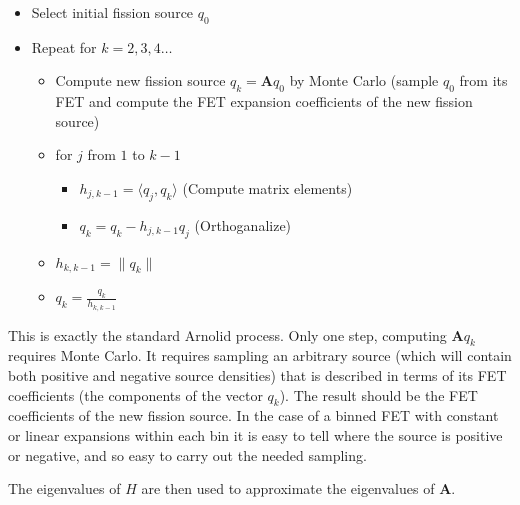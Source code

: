 \documentclass[11pt,onecolumn]{article}
\newcommand{\FM}{\mathbf{A}}
\begin{document}
\begin{itemize}
\item Select initial fission source $q_0$
\item Repeat for $k = 2, 3, 4 \ldots $

\begin{itemize}
\item Compute new fission source $q_k = \FM q_0$ by Monte Carlo (sample $q_0$ from its FET and compute the FET expansion coefficients of the new fission source)
\item for $j$ from $1$ to $k - 1$
\begin{itemize}
  \item $h_{j, k-1} = \langle q_j, q_k \rangle$ (Compute matrix elements)
  \item $q_k = q_k - h_{j,k-1} q_j$ (Orthoganalize)
\end{itemize}
\item $h_{k,k-1} = \| q_k \|$
\item $q_k = \frac{q_k}{h_{k,k-1}}$
\end{itemize}

\end{itemize}

This is exactly the standard Arnolid process.  Only one step, computing $\FM q_k$ requires Monte Carlo.  It requires sampling an arbitrary source (which will contain both positive and negative source densities) that is described in terms of its FET coefficients (the components of the vector $q_k$).  The result should be the FET coefficients of the new fission source.   In the case of a binned FET with constant or linear expansions within each bin it is easy to tell where the source is positive or negative, and so easy to carry out the needed sampling.

The eigenvalues of $H$ are then used to approximate the eigenvalues of $\FM$.
\end{document}
